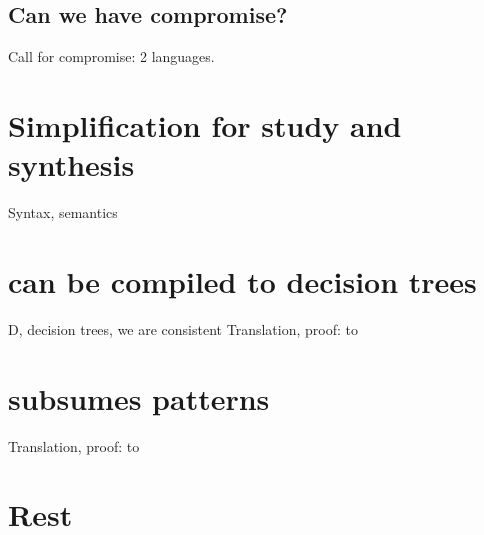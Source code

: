 \documentclass[manuscript,screen,review, 12pt, nonacm]{acmart}
\begin{document}
\begin{outline}[enumerate]
\subsection{Can we have compromise?}

Call for compromise: 2 languages. 

\section{Simplification for study and synthesis}

\1 \PPlus 
\1 \VMinus 
\1 Syntax, semantics 
\section{\VMinus can be compiled to decision trees}
\1 D, decision trees, we are consistent 
\1 Translation, proof: \VMinus to \D
\section{\VMinus subsumes patterns}
\1 Translation, proof: \PPlus to \VMinus
\section{Rest}
\end{outline}





    
\end{document}
